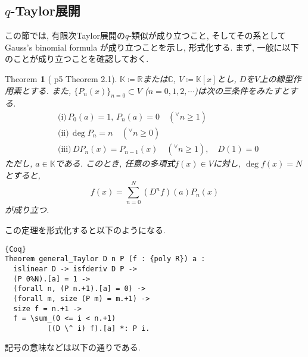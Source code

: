 \documentclass[11pt]{jsreport}
\theoremstyle{mystyle}
\newtheorem{thm}[df]{$\textrm{Theorem}$}
\newcommand{\bthm}{\begin{shadebox} \begin{thm}}
\newcommand{\ethm}{\end{thm} \end{shadebox}}
\newcommand{\bpf}{\begin{proof}}
\newcommand{\epf}{\end{proof}}
\newcommand{\R}{\mathbb{R}}
\newcommand{\C}{\mathbb{C}}
\newcommand{\K}{\mathbb{K}}
\newcommand{\0}{\textbf{0}}
\newcommand{\1}{\textbf{1}}
\newcommand{\2}{\textbf{2}}
\begin{document}
\subsection{$q$-Taylor展開} \label{ssec q_Taylor}
この節では, 有限次Taylor展開の$q$-類似が成り立つこと, そしてその系として Gauss's binomial formula が成り立つことを示し, 形式化する. 
まず, 一般に以下のことが成り立つことを確認しておく. 
\bthm[\cite{Kac} p5 Theorem 2.1] \label{general_Taylor}
$\K\coloneqq\R$または$\C$, $V\coloneqq\K[x]$とし, $D$を$V$上の線型作用素とする. また, 
$\{P_n(x)\}_{n=0}\subset V$ ($n=0,1,2,\cdots$)は次の三条件をみたすとする. 
  \begin{align*}
    &\textrm{(i)}\,P_0(a) = 1,\,P_n(a)=0 \quad ({}^{\forall}n\ge1)\\
    &\textrm{(ii)}\,\deg P_n = n \quad ({}^{\forall}n\ge0)\\
    &\textrm{(iii)}\,DP_n(x) = P_{n-1}(x) \quad ({}^{\forall}n\ge1), \quad D(1) = 0
  \end{align*}
ただし, $a\in\K$である. このとき, 任意の多項式$f(x)\in V$に対し, $\deg f(x)=N$とすると, 
  \[
    f(x) = \sum_{n=0}^N(D^nf)(a)P_n(x)
  \]
が成り立つ. 
\ethm
この定理を形式化すると以下のようになる. 
\begin{lstlisting}{Coq}
Theorem general_Taylor D n P (f : {poly R}) a :
  islinear D -> isfderiv D P ->
  (P 0%N).[a] = 1 ->
  (forall n, (P n.+1).[a] = 0) ->
  (forall m, size (P m) = m.+1) ->
  size f = n.+1 ->
  f = \sum_(0 <= i < n.+1)
          ((D \^ i) f).[a] *: P i. \end{lstlisting}
記号の意味などは以下の通りである. 
\end{document}
